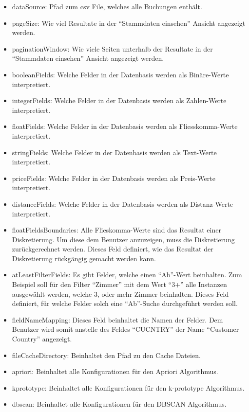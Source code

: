 \begin{itemize}
\item dataSource: Pfad zum \gls{csv} File, welches alle Buchungen enthält.
\item pageSize: Wie viel Resultate in der "`Stammdaten einsehen"' Ansicht angezeigt werden.
\item paginationWindow: Wie viele Seiten unterhalb der Resultate in der "`Stammdaten einsehen"' Ansicht angezeigt werden.
\item booleanFields: Welche Felder in der Datenbasis werden als Binäre-Werte interpretiert.
\item integerFields: Welche Felder in der Datenbasis werden als Zahlen-Werte interpretiert.
\item floatFields: Welche Felder in der Datenbasis werden als Fliesskomma-Werte interpretiert.
\item stringFields: Welche Felder in der Datenbasis werden als Text-Werte interpretiert.
\item priceFields: Welche Felder in der Datenbasis werden als Preis-Werte interpretiert.
\item distanceFields: Welche Felder in der Datenbasis werden als Distanz-Werte interpretiert.
\item floatFieldsBoundaries: Alle Flieskomma-Werte sind das Resultat einer Diskretierung. Um diese dem Benutzer anzuzeigen, muss die Diskretierung zurückgerechnet werden. Dieses Feld definiert, wie das Resultat der Diskretierung rückgängig gemacht werden kann.
\item atLeastFilterFields: Es gibt Felder, welche einen "`Ab"'-Wert beinhalten. Zum Beispiel soll für den Filter "`Zimmer"' mit dem Wert "`3+"' alle Instanzen ausgewählt werden, welche 3, oder mehr Zimmer beinhalten. Dieses Feld definiert, für welche Felder solch eine "`Ab"'-Suche durchgeführt werden soll.
\item fieldNameMapping: Dieses Feld beinhaltet die Namen der Felder. Dem Benutzer wird somit anstelle des Feldes "`CUCNTRY"' der Name "`Customer Country"' angezeigt.
\item fileCacheDirectory: Beinhaltet den Pfad zu den Cache Dateien.
\item apriori: Beinhaltet alle Konfigurationen für den Apriori Algorithmus.
\item kprototype: Beinhaltet alle Konfigurationen für den k-prototype Algorithmus.
\item dbscan: Beinhaltet alle Konfigurationen für den DBSCAN Algorithmus.
\end{itemize}

